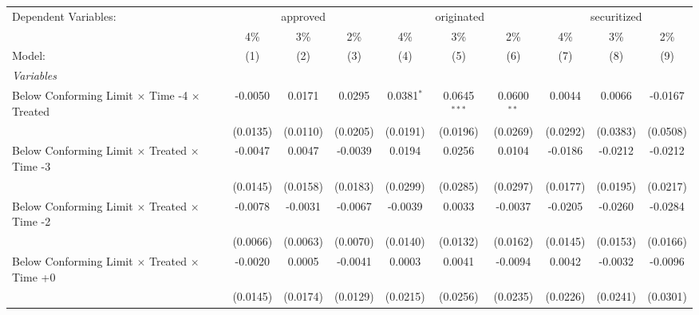 \begingroup
\centering
\begin{tabular}{lccccccccc}
   \tabularnewline \midrule \midrule
   Dependent Variables: & \multicolumn{3}{c}{approved} & \multicolumn{3}{c}{originated} & \multicolumn{3}{c}{securitized}\\
                                                              & 4\%           & 3\%            & 2\%           & 4\%           & 3\%            & 2\%           & 4\%          & 3\%          & 2\% \\    
   Model:                                                     & (1)           & (2)            & (3)           & (4)           & (5)            & (6)           & (7)          & (8)          & (9)\\  
   \midrule
   \emph{Variables}\\
   Below Conforming Limit $\times$ Time -4 $\times$ Treated   & -0.0050       & 0.0171         & 0.0295        & 0.0381$^{*}$  & 0.0645$^{***}$ & 0.0600$^{**}$ & 0.0044       & 0.0066       & -0.0167\\   
                                                              & (0.0135)      & (0.0110)       & (0.0205)      & (0.0191)      & (0.0196)       & (0.0269)      & (0.0292)     & (0.0383)     & (0.0508)\\   
   Below Conforming Limit $\times$ Treated $\times$ Time -3   & -0.0047       & 0.0047         & -0.0039       & 0.0194        & 0.0256         & 0.0104        & -0.0186      & -0.0212      & -0.0212\\   
                                                              & (0.0145)      & (0.0158)       & (0.0183)      & (0.0299)      & (0.0285)       & (0.0297)      & (0.0177)     & (0.0195)     & (0.0217)\\   
   Below Conforming Limit $\times$ Treated $\times$ Time -2   & -0.0078       & -0.0031        & -0.0067       & -0.0039       & 0.0033         & -0.0037       & -0.0205      & -0.0260      & -0.0284\\   
                                                              & (0.0066)      & (0.0063)       & (0.0070)      & (0.0140)      & (0.0132)       & (0.0162)      & (0.0145)     & (0.0153)     & (0.0166)\\   
   Below Conforming Limit $\times$ Treated $\times$ Time +0   & -0.0020       & 0.0005         & -0.0041       & 0.0003        & 0.0041         & -0.0094       & 0.0042       & -0.0032      & -0.0096\\   
                                                              & (0.0145)      & (0.0174)       & (0.0129)      & (0.0215)      & (0.0256)       & (0.0235)      & (0.0226)     & (0.0241)     & (0.0301)\\   

\end{tabular}

